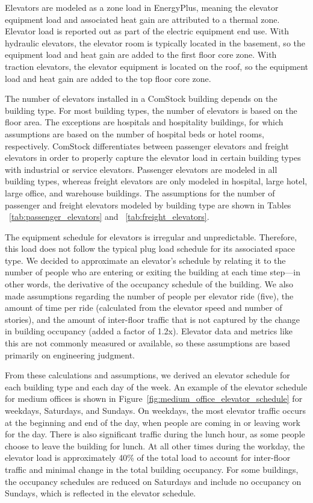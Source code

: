Elevators are modeled as a zone load in EnergyPlus, meaning the elevator equipment load and associated heat gain are attributed to a thermal zone. Elevator load is reported out as part of the electric equipment end use. With hydraulic elevators, the elevator room is typically located in the basement, so the equipment load and heat gain are added to the first floor core zone. With traction elevators, the elevator equipment is located on the roof, so the equipment load and heat gain are added to the top floor core zone.

The number of elevators installed in a ComStock building depends on the building type. For most building types, the number of elevators is based on the floor area. The exceptions are hospitals and hospitality buildings, for which assumptions are based on the number of hospital beds or hotel rooms, respectively. ComStock differentiates between passenger elevators and freight elevators in order to properly capture the elevator load in certain building types with industrial or service elevators. Passenger elevators are modeled in all building types, whereas freight elevators are only modeled in hospital, large hotel, large office, and warehouse buildings. The assumptions for the number of passenger and freight elevators modeled by building type are shown in Tables ~\ref{tab:passenger_elevators} and ~\ref{tab:freight_elevators}.

The equipment schedule for elevators is irregular and unpredictable. Therefore, this load does not follow the typical plug load schedule for its associated space type. We decided to approximate an elevator's schedule by relating it to the number of people who are entering or exiting the building at each time step---in other words, the derivative of the occupancy schedule of the building. We also made assumptions regarding the number of people per elevator ride (five), the amount of time per ride (calculated from the elevator speed and number of stories), and the amount of inter-floor traffic that is not captured by the change in building occupancy (added a factor of 1.2x). Elevator data and metrics like this are not commonly measured or available, so these assumptions are based primarily on engineering judgment. 

From these calculations and assumptions, we derived an elevator schedule for each building type and each day of the week. An example of the elevator schedule for medium offices is shown in Figure~\ref{fig:medium_office_elevator_schedule} for weekdays, Saturdays, and Sundays. On weekdays, the most elevator traffic occurs at the beginning and end of the day, when people are coming in or leaving work for the day. There is also significant traffic during the lunch hour, as some people choose to leave the building for lunch. At all other times during the workday, the elevator load is approximately 40\% of the total load to account for inter-floor traffic and minimal change in the total building occupancy. For some buildings, the occupancy schedules are reduced on Saturdays and include no occupancy on Sundays, which is reflected in the elevator schedule. 

